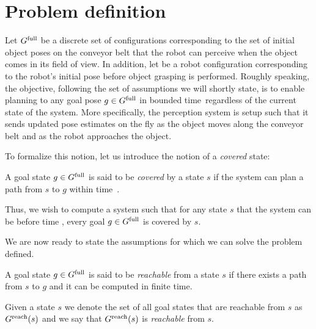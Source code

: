 \documentclass[conference]{IEEEtran}
\begin{document}
\section{Problem definition}

Let $G^{\textrm{full}}$ be a discrete set of configurations corresponding to the set of initial object poses on the conveyor belt that the robot can perceive when the object comes in its field of view. 
%
In addition, let \Shome be a robot configuration corresponding to the robot's initial pose before object grasping is performed.
%
Roughly speaking, the objective, following the set of assumptions we will shortly state, is to enable planning to any goal pose $ g \in G^{\textrm{full}}$ in bounded time~\Tbound regardless of the current state of the system.
More specifically, the perception system is setup such that it sends updated pose estimates on the fly as the object moves along the conveyor belt and as the robot approaches the object.   

To formalize this notion, let us introduce the notion of a \emph{covered} state:
\begin{definition}
    A goal state $g \in G^{\textrm{full}}$ is said to be \emph{covered} by a state $s$ if 
    the system can plan a path from $s$ to $g$ within time~\Tbound.
\end{definition}

Thus, we wish to compute a system such that
for any state $s$ that the system can be before time \Trc, every goal $g \in G^{\textrm{full}}$ is covered by $s$.

We are now ready to state the assumptions for which we can solve the problem defined.

\begin{definition}
    A goal state $g \in G^{\textrm{full}}$ is said to be \emph{reachable} from a state $s$ if there exists a path from $s$ to $g$ and it can be computed in finite time.
\end{definition}

Given a state $s$ we denote the set of all goal states that are reachable from $s$ as $G^{\rm reach}(s)$ and we say that $G^{\rm reach}(s)$ is \emph{reachable} from $s$.


\end{document}
